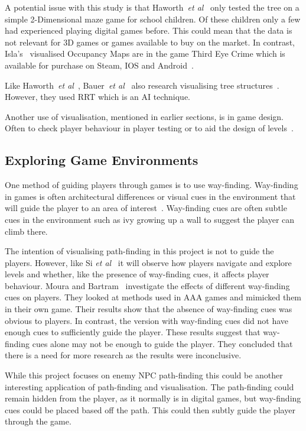 \documentclass[journal]{IEEEtran}
\begin{document}
A potential issue with this study is that Haworth~\textit{et al}~\cite{Haworth2010} only tested the tree on a simple 2-Dimensional maze game for school children. Of these children only a few had experienced playing digital games before.  This could mean that the data is not relevant for 3D games or games available to buy on the market.  In contrast, Isla's~\cite{Isla2014} visualised Occupancy Maps are in the game Third Eye Crime which is available for purchase on Steam, IOS and Android~\cite{Isla2014,game:ThirdEyeCrime}.

Like Haworth~\textit{et al}~\cite{Haworth2010}, Bauer~\textit{et al}~\cite{bauer2012} also research visualising tree structures~\cite{bauer2012}. However, they used RRT which is an AI technique.

Another use of visualisation, mentioned in earlier sections, is in game design. Often to check player behaviour in player testing or to aid the design of levels~\cite{Nelson2011,bauer2012,Tremblay2013,Tremblay2014}. 

\subsection{Exploring Game Environments} \label{Exploring}
One method of guiding players through games is to use way-finding. Way-finding in games is often architectural differences or visual cues in the environment that will guide the player to an area of interest~\cite{si2017,Bacim2008}. Way-finding cues are often subtle cues in the environment such as ivy growing up a wall to suggest the player can climb there.

The intention of visualising path-finding in this project is not to guide the players. However, like Si \textit{et al}~\cite{si2017} it will observe how players navigate and explore levels and whether, like the presence of way-finding cues, it affects player behaviour. 
Moura and Bartram~\cite{moura2014} investigate the effects of different way-finding cues on players. They looked at methods used in AAA games and mimicked them in their own game. Their results show that the absence of way-finding cues was obvious to players. In contrast, the version with way-finding cues did not have enough cues to sufficiently guide the player. These results suggest that way-finding cues alone may not be enough to guide the player. They concluded that there is a need for more research as the results were inconclusive. 

While this project focuses on enemy NPC path-finding this could be another interesting application of path-finding and visualisation. The path-finding could remain hidden from the player, as it normally is in digital games, but way-finding cues could be placed based off the path. This could then subtly guide the player through the game.
\end{document}
